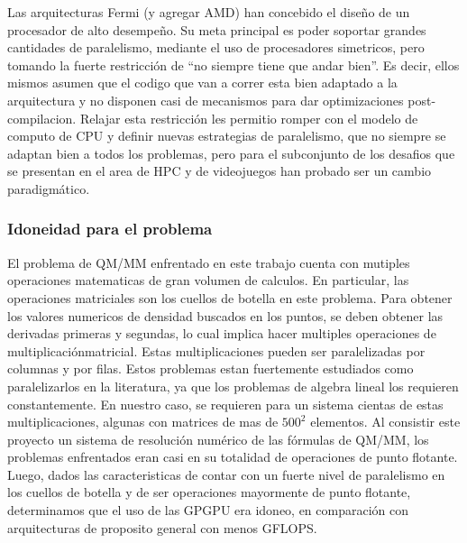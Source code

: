 Las arquitecturas Fermi (y agregar AMD) han concebido el dise\~no de un procesador de alto desempe\~no.
Su meta principal es poder soportar grandes cantidades de paralelismo, mediante el uso de procesadores
simetricos, pero tomando la fuerte restricci\'on de ``no siempre tiene que andar bien''. Es decir, ellos
mismos asumen que el codigo que van a correr esta bien adaptado a la arquitectura y no disponen
casi de mecanismos para dar optimizaciones post-compilacion. Relajar esta restricci\'on
les permitio romper con el modelo de computo de CPU y definir nuevas estrategias de paralelismo,
que no siempre se adaptan bien a todos los problemas, pero para el subconjunto de los desafios que se
presentan en el area de HPC y de videojuegos han probado ser un cambio paradigm\'atico.

\subsubsection{Idoneidad para el problema}
El problema de QM/MM enfrentado en este trabajo cuenta con mutiples operaciones matematicas de gran
volumen de calculos. En particular, las operaciones matriciales son los cuellos de botella en este
problema.
Para obtener los valores numericos de densidad buscados en los puntos, se deben obtener las derivadas primeras
y segundas, lo cual implica hacer multiples operaciones de multiplicaci\'onmatricial. Estas multiplicaciones
pueden ser paralelizadas por columnas y por filas. Estos problemas estan fuertemente estudiados como paralelizarlos
en la literatura, ya que los problemas de algebra lineal los requieren constantemente.
En nuestro caso, se requieren para un sistema cientas de estas multiplicaciones, algunas con matrices de mas de
$500^2$ elementos. Al consistir este proyecto un sistema de resoluci\'on num\'erico de las f\'ormulas de QM/MM,
los problemas enfrentados eran casi en su totalidad de operaciones de punto flotante. Luego, dados las
caracteristicas de contar con un fuerte nivel de paralelismo en los cuellos de botella y de ser operaciones
mayormente de punto flotante, determinamos que el uso de las GPGPU era idoneo, en comparaci\'on con arquitecturas
de proposito general con menos GFLOPS.

